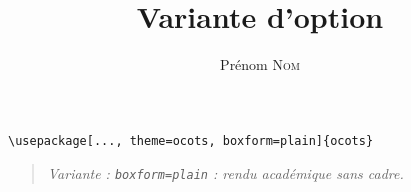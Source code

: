 \documentclass[11pt]{ocots-book}
\title{Variante d'option}
\author{Prénom \textsc{Nom}}
\newcommand{\ocotsvariantnote}[1]{\begin{quote}\itshape Variante : #1\end{quote}}
\begin{document}
\maketitle
\begin{lstlisting}
\usepackage[..., theme=ocots, boxform=plain]{ocots}
\end{lstlisting}
\ocotsvariantnote{\texttt{boxform=plain} : rendu académique sans cadre.}

\end{document}
